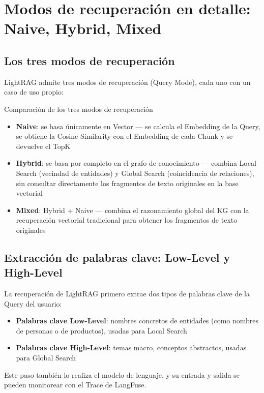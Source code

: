 \section{Modos de recuperación en detalle: Naive, Hybrid, Mixed}

\subsection{Los tres modos de recuperación}

LightRAG admite tres modos de recuperación (Query Mode), cada uno con un caso de uso propio:

\begin{importantbox}{Comparación de los tres modos de recuperación}
\begin{itemize}
    \item \textbf{Naive}: se basa únicamente en Vector — se calcula el Embedding de la Query, se obtiene la Cosine Similarity con el Embedding de cada Chunk y se devuelve el TopK
    \item \textbf{Hybrid}: se basa por completo en el grafo de conocimiento — combina Local Search (vecindad de entidades) y Global Search (coincidencia de relaciones), sin consultar directamente los fragmentos de texto originales en la base vectorial
    \item \textbf{Mixed}: Hybrid + Naive — combina el razonamiento global del KG con la recuperación vectorial tradicional para obtener los fragmentos de texto originales
\end{itemize}
\end{importantbox}

\subsection{Extracción de palabras clave: Low-Level y High-Level}

La recuperación de LightRAG primero extrae dos tipos de palabras clave de la Query del usuario:

\begin{itemize}
    \item \textbf{Palabras clave Low-Level}: nombres concretos de entidades (como nombres de personas o de productos), usadas para Local Search
    \item \textbf{Palabras clave High-Level}: temas macro, conceptos abstractos, usadas para Global Search
\end{itemize}

Este paso también lo realiza el modelo de lenguaje, y su entrada y salida se pueden monitorear con el Trace de LangFuse.

